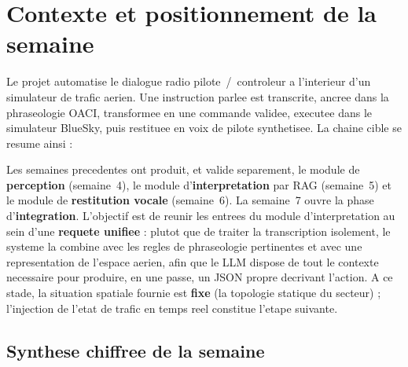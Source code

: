 \documentclass[11pt,a4paper]{article}
\begin{document}
\tableofcontents
\thispagestyle{fancy}
\vspace{1cm}

\section{Contexte et positionnement de la semaine}

Le projet automatise le dialogue radio pilote~/~controleur a l'interieur d'un
simulateur de trafic aerien. Une instruction parlee est transcrite, ancree dans la
phraseologie OACI, transformee en une commande validee, executee dans le simulateur
BlueSky, puis restituee en voix de pilote synthetisee. La chaine cible se resume
ainsi :

\begin{center}
\end{center}

Les semaines precedentes ont produit, et valide separement, le module de
\textbf{perception} (semaine~4), le module d'\textbf{interpretation} par RAG
(semaine~5) et le module de \textbf{restitution vocale} (semaine~6). La semaine~7
ouvre la phase d'\textbf{integration}. L'objectif est de reunir les entrees du module
d'interpretation au sein d'une \textbf{requete unifiee} : plutot que de traiter la
transcription isolement, le systeme la combine avec les regles de phraseologie
pertinentes et avec une representation de l'espace aerien, afin que le LLM dispose de
tout le contexte necessaire pour produire, en une passe, un JSON propre decrivant
l'action. A ce stade, la situation spatiale fournie est \textbf{fixe} (la topologie
statique du secteur) ; l'injection de l'etat de trafic en temps reel constitue
l'etape suivante.

\subsection{Synthese chiffree de la semaine}
\end{document}
